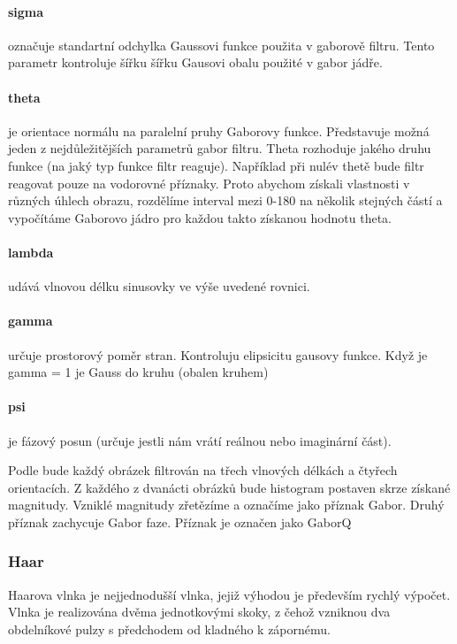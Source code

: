 \documentclass[czech,BP]{thesiskiv}
\begin{document}
\paragraph{sigma} označuje standartní odchylka Gaussovi funkce použita v gaborově filtru. Tento parametr kontroluje šířku šířku Gausovi obalu použité v gabor jádře.

\paragraph{theta} je orientace normálu na paralelní pruhy Gaborovy funkce. Představuje možná jeden z nejdůležitějších parametrů gabor filtru. Theta rozhoduje jakého druhu funkce (na jaký typ funkce filtr reaguje). Například při nulév thetě bude filtr reagovat pouze na vodorovné příznaky. Proto abychom získali vlastnosti v různých úhlech obrazu, rozdělíme interval mezi 0-180 na několik stejných částí a vypočítáme Gaborovo jádro pro každou takto získanou hodnotu theta.

\paragraph{lambda} udává vlnovou délku sinusovky ve výše uvedené rovnici.

\paragraph{gamma} určuje prostorový poměr stran. Kontroluju elipsicitu gausovy funkce. Když je gamma = 1 je Gauss do kruhu (obalen kruhem)

\paragraph{psi} je fázový posun (určuje jestli nám vrátí reálnou nebo imaginární část). \\ 

\par Podle \citep{JEC} bude každý obrázek filtrován na třech vlnových délkách a čtyřech orientacích. Z každého z dvanácti obrázků bude histogram postaven skrze získané magnitudy. Vzniklé magnitudy zřetězíme a označíme jako příznak Gabor. Druhý příznak zachycuje Gabor faze. Příznak je označen jako GaborQ



\subsubsection{Haar}
\par Haarova vlnka je nejjednodušší vlnka, jejiž výhodou je především rychlý výpočet. Vlnka je realizována dvěma jednotkovými skoky, z čehož vzniknou dva obdelníkové pulzy s předchodem od kladného k zápornému. 
\end{document}
